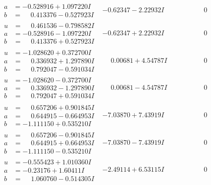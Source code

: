 \documentclass[1p]{elsarticle_modified}
\theoremstyle{definition}
\begin{document}
$$\begin{array}{c|c|c}
\begin{aligned}
a &= -0.528916 + 1.097220 I \\
b &= \phantom{-}0.413376 - 0.527923 I\end{aligned}
 & -0.62347 - 2.22932 I & \phantom{-0.000000 } 0 \\ \hline\begin{aligned}
u &= \phantom{-}0.461536 - 0.798582 I \\
a &= -0.528916 - 1.097220 I \\
b &= \phantom{-}0.413376 + 0.527923 I\end{aligned}
 & -0.62347 + 2.22932 I & \phantom{-0.000000 } 0 \\ \hline\begin{aligned}
u &= -1.028620 + 0.372700 I \\
a &= \phantom{-}0.336932 + 1.297890 I \\
b &= \phantom{-}0.792047 - 0.591034 I\end{aligned}
 & \phantom{-}0.00681 + 4.54787 I & \phantom{-0.000000 } 0 \\ \hline\begin{aligned}
u &= -1.028620 - 0.372700 I \\
a &= \phantom{-}0.336932 - 1.297890 I \\
b &= \phantom{-}0.792047 + 0.591034 I\end{aligned}
 & \phantom{-}0.00681 - 4.54787 I & \phantom{-0.000000 } 0 \\ \hline\begin{aligned}
u &= \phantom{-}0.657206 + 0.901845 I \\
a &= \phantom{-}0.644915 - 0.664953 I \\
b &= -1.111150 + 0.535210 I\end{aligned}
 & -7.03870 + 7.43919 I & \phantom{-0.000000 } 0 \\ \hline\begin{aligned}
u &= \phantom{-}0.657206 - 0.901845 I \\
a &= \phantom{-}0.644915 + 0.664953 I \\
b &= -1.111150 - 0.535210 I\end{aligned}
 & -7.03870 - 7.43919 I & \phantom{-0.000000 } 0 \\ \hline\begin{aligned}
u &= -0.555423 + 1.010360 I \\
a &= -0.23176 + 1.60411 I \\
b &= \phantom{-}1.060760 - 0.514305 I\end{aligned}
 & -2.49114 + 6.53115 I & \phantom{-0.000000 } 0 \\ \hline\begin{aligned}

\end{aligned}
\end{array}$$
\end{document}

